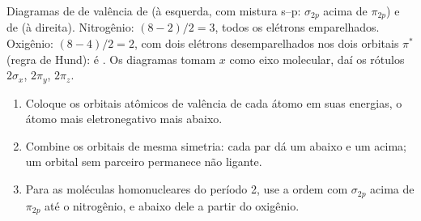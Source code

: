 \begin{omfigure}
\begin{MOdiagram}[names, labels, style=square, distance=4.2cm, labels-fs=\scriptsize]
\end{MOdiagram}
\hfill
\begin{MOdiagram}[names, labels, style=square, distance=4.2cm, labels-fs=\scriptsize]
\end{MOdiagram}

{\small Diagramas de  de valência de  (à esquerda, com
mistura s--p: $\sigma_{2p}$ acima de $\pi_{2p}$) e de  (à direita).
Nitrogênio:  $(8 - 2)/2 = 3$, todos os elétrons emparelhados.
Oxigênio:  $(8 - 4)/2 = 2$, com dois elétrons desemparelhados
nos dois orbitais $\pi^*$ (regra de Hund):  é . Os
diagramas tomam $x$ como eixo molecular, daí os rótulos $2\sigma_x$, $2\pi_y$,
$2\pi_z$.}
\end{omfigure}

\begin{method}\label{met:b2:diatomic-mos:build-diagram}
\begin{enumerate}
  \item Coloque os orbitais atômicos de valência de cada átomo em suas
        energias, o átomo mais eletronegativo mais abaixo.
  \item Combine os orbitais de mesma simetria: cada par dá um 
        abaixo e um  acima; um orbital sem parceiro
        permanece não ligante.
  \item Para as moléculas homonucleares do período 2, use a ordem com
        $\sigma_{2p}$ acima de $\pi_{2p}$ até o nitrogênio, e abaixo dele a
        partir do oxigênio.
\end{enumerate}
\end{method}


